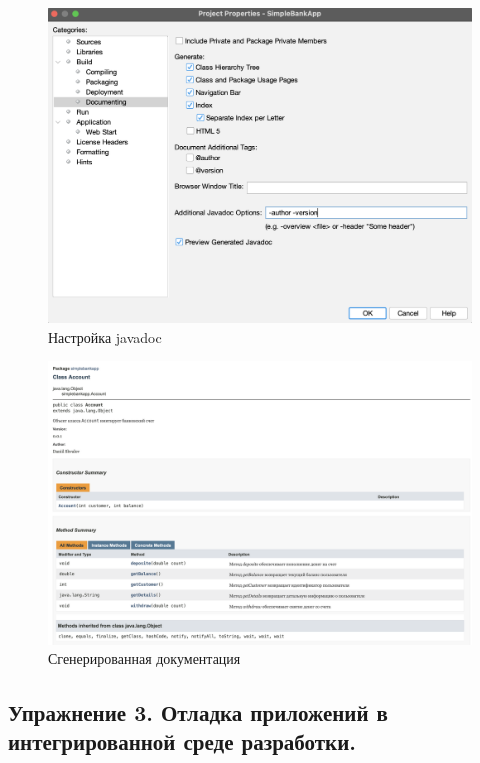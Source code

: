 \documentclass[a4paper, 14pt]{extarticle}
\begin{document}
\begin{figure}[H]
  \centering
  \includegraphics[width=\textwidth]{images/task-2/8.png}
  \caption{Настройка javadoc}
  \label{fig:task-2-8}
\end{figure}

\begin{figure}[H]
  \centering
  \includegraphics[width=\textwidth]{images/task-2/9.png}
  \caption{Сгенерированная документация}
  \label{fig:task-2-9}
\end{figure}

\subsection*{
  Упражнение 3. Отладка приложений в интегрированной среде разработки.
}
\end{document}
